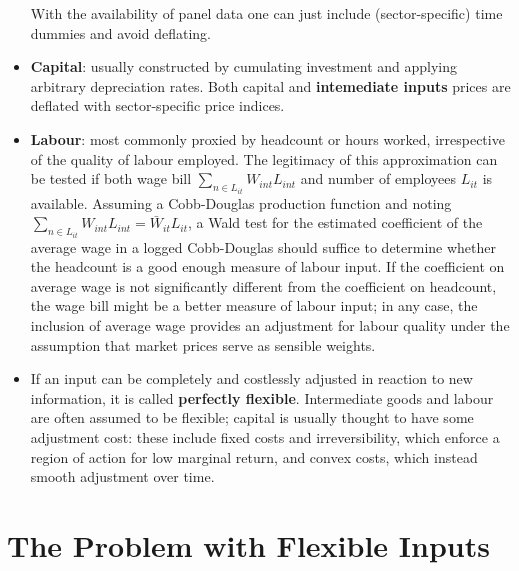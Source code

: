 \documentclass[11pt]{article}
\begin{document}
\begin{itemize}
	With the availability of panel data one can just include (sector-specific) time dummies and avoid deflating.
	\item \textbf{Capital}: usually constructed by cumulating investment and applying arbitrary depreciation rates.
	Both capital and \textbf{intemediate inputs} prices are deflated with sector-specific price indices.
	\item \textbf{Labour}: most commonly proxied by headcount or hours worked, irrespective of the quality of labour employed.
	The legitimacy of this approximation can be tested if both wage bill $\sum_{n \in L_{it}}W_{int}L_{int}$ and number of employees $L_{it}$ is available.
	Assuming a Cobb-Douglas production function and noting $\sum_{n \in L_{it}}W_{int}L_{int} = \bar{W}_{it}L_{it}$, a Wald test for the estimated coefficient of the average wage in a logged Cobb-Douglas should suffice to determine whether the headcount is a good enough measure of labour input.
	If the coefficient on average wage is not significantly different from the coefficient on headcount, the wage bill might be a better measure of labour input; in any case, the inclusion of average wage provides an adjustment for labour quality under the assumption that market prices serve as sensible weights.
	\item If an input can be completely and costlessly adjusted in reaction to new information, it is called \textbf{perfectly flexible}. Intermediate goods and labour are often assumed to be flexible; capital is usually thought to have some adjustment cost: these include fixed costs and irreversibility, which enforce a region of action for low marginal return, and convex costs, which instead smooth adjustment over time.
\end{itemize}

\section{The Problem with Flexible Inputs}
\end{document}
